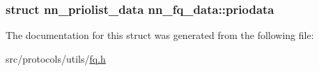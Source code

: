 \subsubsection[{priodata}]{\setlength{\rightskip}{0pt plus 5cm}struct {\bf nn\+\_\+priolist\+\_\+data} nn\+\_\+fq\+\_\+data\+::priodata}\hypertarget{structnn__fq__data_a404fcb98abd11c3e90edf6ca0b294432}{}\label{structnn__fq__data_a404fcb98abd11c3e90edf6ca0b294432}


The documentation for this struct was generated from the following file\+:\begin{DoxyCompactItemize}
\item 
src/protocols/utils/\hyperlink{fq_8h}{fq.\+h}\end{DoxyCompactItemize}
